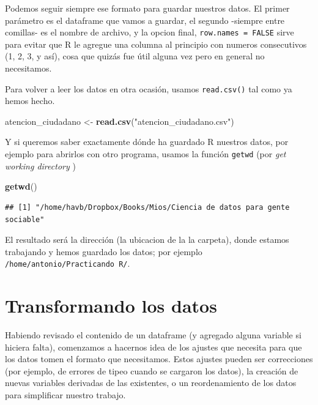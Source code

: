\documentclass[spanish,]{book}
\newenvironment{Shaded}{\begin{snugshade}}{\end{snugshade}}
\newcommand{\KeywordTok}[1]{\textcolor[rgb]{0.13,0.29,0.53}{\textbf{#1}}}
\newcommand{\NormalTok}[1]{#1}
\newcommand{\StringTok}[1]{\textcolor[rgb]{0.31,0.60,0.02}{#1}}
\begin{document}
Podemos seguir siempre ese formato para guardar nuestros datos. El primer parámetro es el dataframe que vamos a guardar, el segundo -siempre entre comillas- es el nombre de archivo, y la opcion final, \texttt{row.names\ =\ FALSE} sirve para evitar que R le agregue una columna al principio con numeros consecutivos (1, 2, 3, y así), cosa que quizás fue útil alguna vez pero en general no necesitamos.

Para volver a leer los datos en otra ocasión, usamos \texttt{read.csv()} tal como ya hemos hecho.

\begin{Shaded}
\begin{Highlighting}[]
\NormalTok{atencion_ciudadano <-}\StringTok{ }\KeywordTok{read.csv}\NormalTok{(}\StringTok{"atencion_ciudadano.csv"}\NormalTok{)}
\end{Highlighting}
\end{Shaded}

Y si queremos saber exactamente dónde ha guardado R nuestros datos, por ejemplo para abrirlos con otro programa, usamos la función \texttt{getwd} (por \emph{get working directory} )

\begin{Shaded}
\begin{Highlighting}[]
\KeywordTok{getwd}\NormalTok{()}
\end{Highlighting}
\end{Shaded}

\begin{verbatim}
## [1] "/home/havb/Dropbox/Books/Mios/Ciencia de datos para gente sociable"
\end{verbatim}

El resultado será la dirección (la ubicacion de la la carpeta), donde estamos trabajando y hemos guardado los datos; por ejemplo \texttt{/home/antonio/Practicando\ R/}.

\hypertarget{transformando-los-datos}{%
\section{Transformando los datos}\label{transformando-los-datos}}

Habiendo revisado el contenido de un dataframe (y agregado alguna variable si hiciera falta), comenzamos a hacernos idea de los ajustes que necesita para que los datos tomen el formato que necesitamos. Estos ajustes pueden ser correcciones (por ejemplo, de errores de tipeo cuando se cargaron los datos), la creación de nuevas variables derivadas de las existentes, o un reordenamiento de los datos para simplificar nuestro trabajo.
\end{document}

